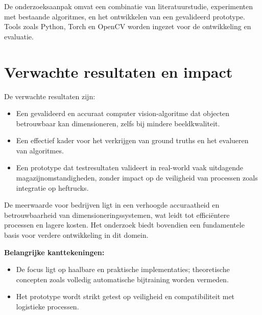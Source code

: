 De onderzoeksaanpak omvat een combinatie van literatuurstudie, experimenten met bestaande algoritmes, en het ontwikkelen van een gevalideerd prototype. Tools zoals Python, Torch en OpenCV worden ingezet voor de ontwikkeling en evaluatie.


\section{Verwachte resultaten en impact}
\label{sec:verwachte_resultaten}

De verwachte resultaten zijn:
\begin{itemize}
    \item Een gevalideerd en accuraat computer vision-algoritme dat objecten betrouwbaar kan dimensioneren, zelfs bij mindere beeldkwaliteit.
    \item Een effectief kader voor het verkrijgen van ground truths en het evalueren van algoritmes.
    \item Een prototype dat testresultaten valideert in real-world vaak uitdagende magazijnomstandigheden, zonder impact op de veiligheid van processen zoals integratie op heftrucks.
\end{itemize}

De meerwaarde voor bedrijven ligt in een verhoogde accuraatheid en betrouwbaarheid van dimensioneringssystemen, wat leidt tot efficiëntere processen en lagere kosten. Het onderzoek biedt bovendien een fundamentele basis voor verdere ontwikkeling in dit domein.

\vspace{1cm}
\noindent \textbf{Belangrijke kanttekeningen:}
\begin{itemize}
    \item De focus ligt op haalbare en praktische implementaties; theoretische concepten zoals volledig automatische bijtraining worden vermeden.
    \item Het prototype wordt strikt getest op veiligheid en compatibiliteit met logistieke processen.
\end{itemize}
